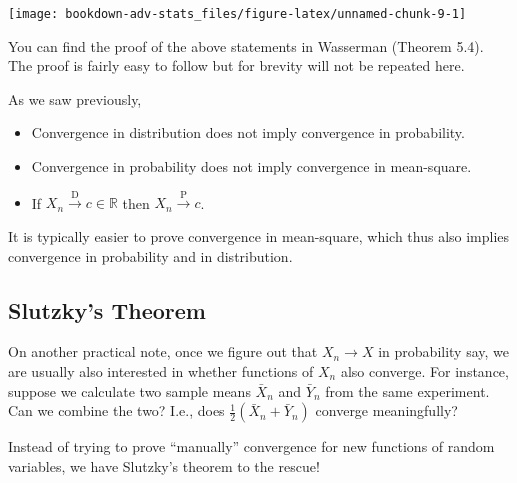\documentclass[
]{book}
\providecommand{\tightlist}{%
  \setlength{\itemsep}{0pt}\setlength{\parskip}{0pt}}
\newcommand{\bbR}{\mathbb{R}}
\theoremstyle{definition}
\theoremstyle{definition}
\theoremstyle{definition}
\theoremstyle{definition}
\theoremstyle{remark}
\begin{document}
\begin{center}\texttt{[image: bookdown-adv-stats\_files/figure-latex/unnamed-chunk-9-1]} \end{center}

You can find the proof of the above statements in Wasserman (Theorem 5.4). The proof is fairly easy to follow but for brevity will not be repeated here.

As we saw previously,

\begin{itemize}
\tightlist
\item
  Convergence in distribution does not imply convergence in probability.
\item
  Convergence in probability does not imply convergence in mean-square.
\item
  If \(X_n \xrightarrow{\text{D}}c\in\bbR\) then \(X_n \xrightarrow{\text{P}}c\).
\end{itemize}

It is typically easier to prove convergence in mean-square, which thus also implies convergence in probability and in distribution.

\hypertarget{slutzkys-theorem}{%
\subsection{Slutzky's Theorem}\label{slutzkys-theorem}}

On another practical note, once we figure out that \(X_n\to X\) in probability say, we are usually also interested in whether functions of \(X_n\) also converge.
For instance, suppose we calculate two sample means \(\bar X_n\) and \(\bar Y_n\) from the same experiment.
Can we combine the two? I.e., does \(\frac{1}{2}(\bar X_n + \bar Y_n)\) converge meaningfully?

Instead of trying to prove ``manually'' convergence for new functions of random variables, we have Slutzky's theorem to the rescue!
\end{document}
